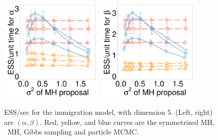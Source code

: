 \begin{figure}[H]
 \begin{minipage}[hp]{0.65\linewidth}
  \centering
    \includegraphics [width=0.44\textwidth, angle=0]{figs/new_whole_exp_figs/q_alpha_dim5.pdf}
    \includegraphics [width=0.44\textwidth, angle=0]{figs/new_whole_exp_figs/q_beta_dim5.pdf}
  \end{minipage}
  \begin{minipage}[!hp]{0.33\linewidth}
    \caption{ESS/sec for the immigration model, with dimension 5. (Left, 
      right) are $(\alpha, \beta)$. Red, yellow, and blue curves are the symmetrized MH,
  \naive\ MH, Gibbs sampling and particle MCMC.}
     \label{fig:ESS_Q_D55}
  \end{minipage}
	\end{figure}
